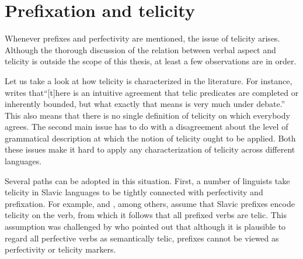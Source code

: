 \section{Prefixation and telicity}\label{section:new:telicity}
Whenever prefixes and perfectivity are mentioned, the issue of telicity arises. Although the thorough discussion of the relation between verbal aspect and telicity is outside the scope of this thesis, at least a few observations are in order. %

Let us take a look at how telicity is characterized in the literature. For instance, \citet[3]{Rothstein:08a} writes that``[t]here is an intuitive agreement that telic predicates are completed or inherently bounded, but what exactly that means is very much under debate.'' This also means that there is no single definition of telicity on which everybody agrees. The second main issue has to do with a disagreement about the level of grammatical description at which the notion of telicity ought to be applied. Both these issues make it hard to apply any characterization of telicity across different languages. 

Several paths can be adopted in this situation. First, a number of linguists take telicity in Slavic languages to be tightly connected with perfectivity and prefixation. For example, \citet{Borer:03} and \citet{vanHout:08}, among others, assume that Slavic prefixes encode telicity on the verb, from which it follows that all prefixed verbs are telic. This assumption was challenged by \citet{Filip:03} who pointed out that although it is plausible to regard all perfective verbs as semantically telic, prefixes cannot be viewed as perfectivity or telicity markers.  

